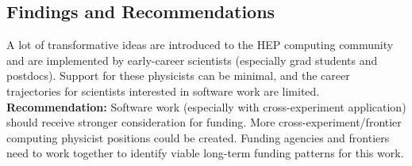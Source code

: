 \begin{comment}
\subsection{Personnel support case studies}
\paragraph{PDG}
The PDG is recognized as important despite not being innovative.  We all expect the PDG to be there.

\paragraph{ROOT}
They don't have funding cycles? \cite{Naumann:2022pub}

\paragraph{XSEDE ACCESS ECSS/SGCI}

The SGCI funding model is based on the XSEDE ECSS program.

\paragraph{CTEQ}

\end{comment}

\subsection{Findings and Recommendations}
A lot of transformative ideas are introduced to the HEP computing community and are implemented by early-career scientists (especially grad students and postdocs). Support for these physicists can be minimal, and the career trajectories for scientists interested in software work are limited.\\
\textbf{Recommendation:} Software work (especially with cross-experiment application) should receive stronger consideration for funding. More cross-experiment/frontier computing physicist positions could be created.  Funding agencies and frontiers need to work together to identify viable long-term funding patterns for this work.



